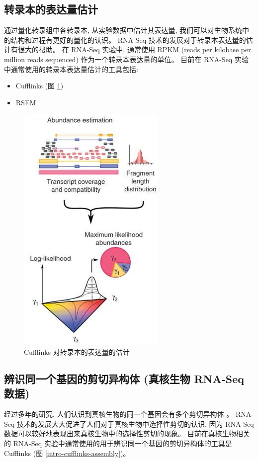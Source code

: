 \subsection{转录本的表达量估计}
通过量化转录组中各转录本, 从实验数据中估计其表达量, 
我们可以对生物系统中的结构和过程有更好的量化的认识。 
RNA-Seq 技术的发展对于转录本表达量的估计有很大的帮助。 
在 RNA-Seq 实验中, 
通常使用 RPKM (reads per kilobase per million reads sequenced) 
\cite{mortazavi2008mapping} 作为一个转录本表达量的单位。 
目前在 RNA-Seq 实验中通常使用的转录本表达量估计的工具包括: 
\begin{itemize}
\item Cufflinks \cite{cufflinks.2010} (图 \ref{intro-cufflinks-abundance})
\item RSEM \cite{li2011rsem}
\end{itemize}

\begin{figure}[!t]
\centering
\includegraphics[height=0.5\textheight]{figures/cufflinks-abundance.jpg}
\caption{Cufflinks 对转录本的表达量的估计 \cite{cufflinks.2010}}
\label{intro-cufflinks-abundance}
\end{figure}

\subsection{辨识同一个基因的剪切异构体 (真核生物 RNA-Seq 数据)}
经过多年的研究, 人们认识到真核生物的同一个基因会有多个剪切异构体 
\cite{gilbert1978genes, rosenfeld1982calcitonin, early1980two, 
citeulike:447573, modrek2002genomic}。 
RNA-Seq 技术的发展大大促进了人们对于真核生物中选择性剪切的认识, 
因为 RNA-Seq 数据可以较好地表现出来真核生物中的选择性剪切的现象。 
目前在真核生物相关的 RNA-Seq 实验中通常使用的用于辨识同一个基因的剪切异构体的工具是 
Cufflinks \cite{cufflinks.2010} (图 \ref{intro-cufflinks-assembly})。

